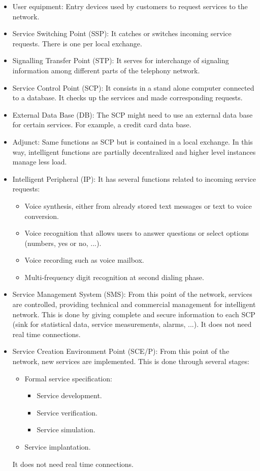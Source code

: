 \documentclass[../main.tex]{subfiles}
\begin{document}
\begin{itemize}
	\item User equipment: Entry devices used by customers to request services to the network.
	\item Service Switching Point (SSP): It catches or switches incoming service requests. There is one per local exchange.
	\item Signalling Transfer Point (STP): It serves for interchange of signaling information among different parts of the telephony network.
	\item Service Control Point (SCP): It consists in a stand alone computer connected to a database. It checks up the services and made corresponding requests.
	\item External Data Base (DB): The SCP might need to use an external data base for certain services. For example, a credit card data base.
	\item Adjunct: Same functions as SCP but is contained in a local exchange. In this way, intelligent functions are partially decentralized and higher level instances manage less load.
	\item {
		Intelligent Peripheral (IP): It has several functions related to incoming service requests:
		\begin{itemize}
			\item Voice synthesis, either from already stored text messages or text to voice conversion.
			\item Voice recognition that allows users to answer questions or select options (numbers, yes or no, ...).
			\item Voice recording such as voice mailbox.
			\item Multi-frequency digit recognition at second dialing phase.
		\end{itemize}
	}
	\item Service Management System (SMS): From this point of the network, services are controlled, providing technical and commercial management for intelligent network. This is done by giving complete and secure information to each SCP (sink for statistical data, service measurements, alarms, ...). It does not need real time connections.
	\item {
		Service Creation Environment Point (SCE/P): From this point of the network, new services are implemented. This is done through several stages:
		\begin{itemize}
			\item {
				Formal service specification:
				\begin{itemize}
					\item Service development.
					\item Service verification.
					\item Service simulation.
				\end{itemize}
			}
			\item Service implantation.
		\end{itemize}
		 It does not need real time connections.
	}
\end{itemize}
\end{document}
